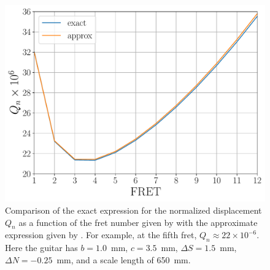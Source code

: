 
 \begin{figure}
  \centering
  \includegraphics[width=5.0in]{../figures/qn_test}
  \caption{\label{fig:qn_test} Comparison of the exact expression for the normalized displacement $Q_n$ as a function of the fret number given by  with the approximate expression given by . For example, at the fifth fret, $Q_n \approx 22 \times 10^{-6}$. Here the guitar has $b = 1.0$~mm, $c = 3.5$~mm, $\Delta S = 1.5$~mm, $\Delta N = -0.25$~mm, and a scale length of 650~mm.}
 \end{figure}


